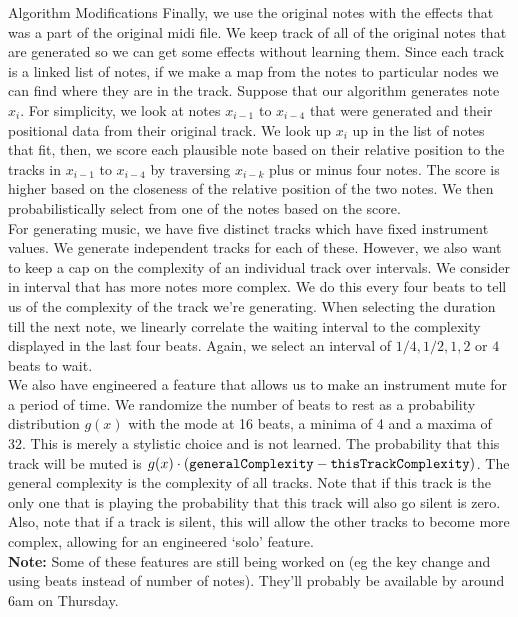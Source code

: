 \documentclass[11pt]{article}
\begin{document}
\begin{section}{Algorithm Modifications}
Finally, we use the original notes with the effects that was a part of the original midi file. We keep track of all of the original notes that are generated so we can get some effects without learning them. Since each track is a linked list of notes, if we make a map from the notes to particular nodes we can find where they are in the track. Suppose that our algorithm generates note $x_i$. For simplicity, we look at notes $x_{i-1}$ to $x_{i-4}$ that were generated and their positional data from their original track. We look up $x_i$ up in the list of notes that fit, then, we score each plausible note based on their relative position to the tracks in $x_{i-1}$ to $x_{i-4}$ by traversing $x_{i-k}$ plus or minus four notes. The score is higher based on the closeness of the relative position of the two notes. We then probabilistically select from one of the notes based on the score.\\

For generating music, we have five distinct tracks which have fixed instrument values. We generate independent tracks for each of these. However, we also want to keep a cap on the complexity of an individual track over intervals. We consider in interval that has more notes more complex. We do this every four beats to tell us of the complexity of the track we're generating. When selecting the duration till the next note, we linearly correlate the waiting interval to the complexity displayed in the last four beats. Again, we select an interval of $1/4, 1/2, 1, 2$ or $4$ beats to wait. \\

We also have engineered a feature that allows us to make an instrument mute for a period of time. We randomize the number of beats to rest as a probability distribution $g(x)$ with the mode at 16 beats, a minima of 4 and a maxima of 32. This is merely a stylistic choice and is not learned. The probability that this track will be muted is $g(x) \cdot (\verb|generalComplexity| - \verb|thisTrackComplexity|)$. The general complexity is the complexity of all tracks. Note that if this track is the only one that is playing the probability that this track will also go silent is zero. Also, note that if a track is silent, this will allow the other tracks to become more complex, allowing for an engineered `solo' feature.\\

\textbf{Note:} Some of these features are still being worked on (eg the key change and using beats instead of number of notes). They'll probably be available by around 6am on Thursday.   
\end{section}
\end{document}
